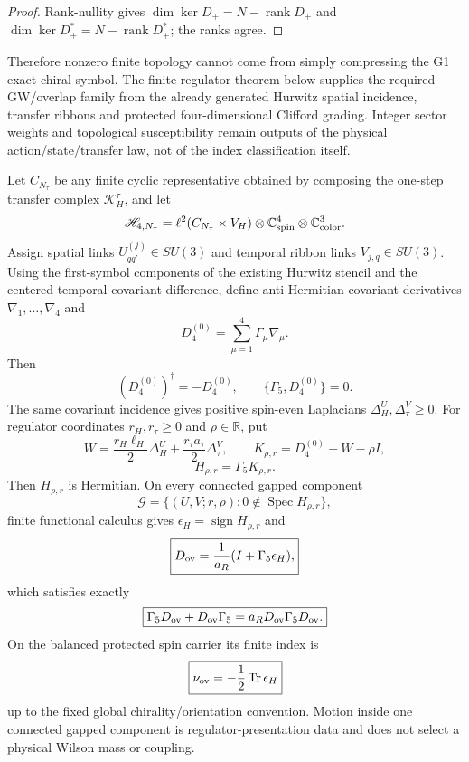\documentclass[12pt,a4paper]{article}
\begin{document}
\begin{proof}
Rank-nullity gives
$\dim\ker D_+=N-\operatorname{rank}D_+$ and
$\dim\ker D_+^*=N-\operatorname{rank}D_+^*$; the ranks agree.
\end{proof}

Therefore nonzero finite topology cannot come from simply compressing the G1
exact-chiral symbol.  The finite-regulator theorem below supplies the required
GW/overlap family from the already generated Hurwitz spatial incidence,
transfer ribbons and protected four-dimensional Clifford grading.  Integer
sector weights and topological susceptibility remain outputs of the physical
action/state/transfer law, not of the index classification itself.

\begin{theorem}
\label{p10:thm:v190-generated-4d-gw-regulator}
Let $C_{N_\tau}$ be any finite cyclic representative obtained by composing the
one-step transfer complex $\mathcal K_H^\tau$, and let
\[
 \mathscr H_{4,N_\tau}
 =\ell^2(C_{N_\tau}\times V_H)\otimes\mathbb C^4_{\rm spin}
 \otimes\mathbb C^3_{\rm color}.
\]
Assign spatial links $U^{(j)}_{qq'}\in SU(3)$ and temporal ribbon links
$V_{j,q}\in SU(3)$.  Using the first-symbol components of the existing
Hurwitz stencil and the centered temporal covariant difference, define
anti-Hermitian covariant derivatives $\nabla_1,\ldots,\nabla_4$ and
\[
 \boxed{D_4^{(0)}=\sum_{\mu=1}^4\Gamma_\mu\nabla_\mu.}
\]
Then
\[
 (D_4^{(0)})^\dagger=-D_4^{(0)},\qquad
 \{\Gamma_5,D_4^{(0)}\}=0.
\]
The same covariant incidence gives positive spin-even Laplacians
$\Delta_H^U,\Delta_\tau^V\ge0$.  For regulator coordinates
$r_H,r_\tau\ge0$ and $\rho\in\mathbb R$, put
\[
 W=\frac{r_H\ell_H}{2}\Delta_H^U
   +\frac{r_\tau a_\tau}{2}\Delta_\tau^V,
 \qquad K_{\rho,r}=D_4^{(0)}+W-\rho I,
\]
\[
 \boxed{H_{\rho,r}=\Gamma_5K_{\rho,r}.}
\]
Then $H_{\rho,r}$ is Hermitian.  On every connected gapped component
\[
 \mathcal G=\{(U,V;r,\rho):0\notin\operatorname{Spec}H_{\rho,r}\},
\]
finite functional calculus gives $\epsilon_H=\operatorname{sign}H_{\rho,r}$
and
\[
 \boxed{D_{\rm ov}=\frac1{a_R}(I+\Gamma_5\epsilon_H),}
\]
which satisfies exactly
\[
 \boxed{\Gamma_5D_{\rm ov}+D_{\rm ov}\Gamma_5
 =a_RD_{\rm ov}\Gamma_5D_{\rm ov}.}
\]
On the balanced protected spin carrier its finite index is
\[
 \boxed{\nu_{\rm ov}=-\frac12\operatorname{Tr}\epsilon_H}
\]
up to the fixed global chirality/orientation convention.  Motion inside one
connected gapped component is regulator-presentation data and does not select
a physical Wilson mass or coupling.
\end{theorem}
\end{document}
